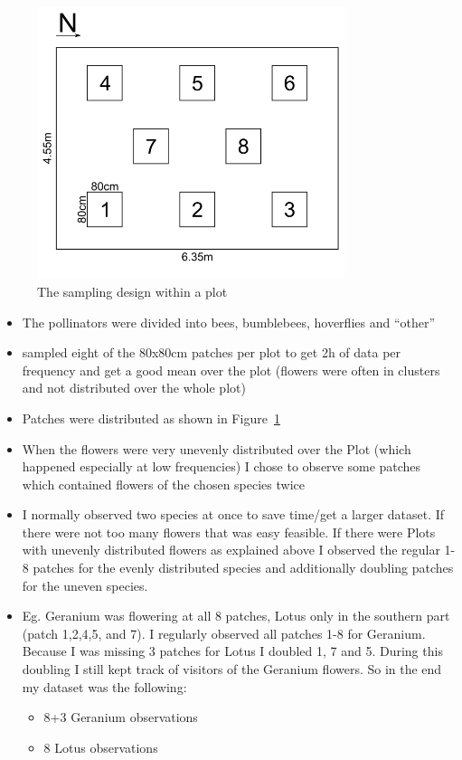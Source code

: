 \begin{figure}
\centering
\includegraphics[width=9cm]{Images/plot-design}
 \caption{The sampling design within a plot}
 \label{fig:plot-design}
\end{figure}




\begin{itemize}
\item The pollinators were divided into bees, bumblebees, hoverflies and “other”
\item sampled eight of the 80x80cm patches per plot to get 2h of data per frequency and get a good mean over the plot (flowers were often in clusters and not distributed over the whole plot)
\item Patches were distributed as shown in Figure~\ref{fig:plot-design}
\end{itemize}

\begin{itemize}
\item When the flowers were very unevenly distributed over the Plot (which happened especially at low frequencies) I chose to observe some patches which contained flowers of the chosen species twice
\item I normally observed two species at once to save time/get a larger dataset. If there were not too many flowers that was easy feasible. If there were Plots with unevenly distributed flowers as explained above I observed the regular 1-8 patches for the evenly distributed species and additionally doubling patches for the uneven species. 
\item Eg. Geranium was flowering at all 8 patches, Lotus only in the southern part (patch 1,2,4,5, and 7). I regularly observed all patches 1-8 for Geranium. Because I was missing 3 patches for Lotus I doubled 1, 7 and 5. During this doubling I still kept track of visitors of the Geranium flowers. So in the end my dataset was the following:
\begin{itemize}
	\item 8+3 Geranium observations
	\item 8 Lotus observations
\end{itemize}
\end{itemize}


